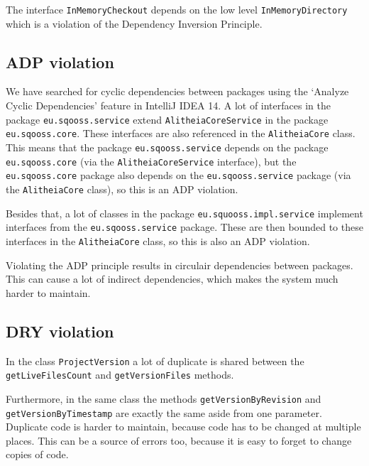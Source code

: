 \documentclass{article}
\begin{document}
The interface \verb|InMemoryCheckout| depends on the low level \verb|InMemoryDirectory| which is a violation of the Dependency Inversion Principle. %

\subsection{ADP violation}

We have searched for cyclic dependencies between packages using the `Analyze Cyclic Dependencies' feature in IntelliJ IDEA 14. A lot of interfaces in the package \verb|eu.sqooss.service| extend \verb|AlitheiaCoreService| in the package \verb|eu.sqooss.core|. These interfaces are also referenced in the \verb|AlitheiaCore| class. This means that the package \verb|eu.sqooss.service| depends on the package \verb|eu.sqooss.core| (via the \verb|AlitheiaCoreService| interface), but the \verb|eu.sqooss.core| package also depends on the \verb|eu.sqooss.service| package (via the \verb|AlitheiaCore| class), so this is an ADP violation.


Besides that, a lot of classes in the package \verb|eu.squooss.impl.service| implement interfaces from the \verb|eu.sqooss.service| package. These are then bounded to these interfaces in the \verb|AlitheiaCore| class, so this is also an ADP violation.

Violating the ADP principle results in circulair dependencies between packages. This can cause a lot of indirect dependencies, which makes the system much harder to maintain\cite{stan4j}.

\subsection{DRY violation}
In the class \verb|ProjectVersion| a lot of duplicate is shared between the \verb|getLiveFilesCount| and \verb|getVersionFiles| methods. 

Furthermore, in the same class the methods \verb|getVersionByRevision| and \verb|getVersionByTimestamp| are exactly the same aside from one parameter.
Duplicate code is harder to maintain, because code has to be changed at multiple places. This can be a source of errors too, because it is easy to forget to change copies of code. 

\end{document}
